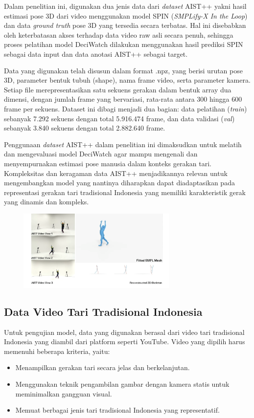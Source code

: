 Dalam penelitian ini, digunakan dua jenis data dari \textit{dataset} AIST++ yakni hasil estimasi pose 3D dari video menggunakan model SPIN (\textit{SMPLify-X In the Loop}) dan data \textit{ground truth} pose 3D yang tersedia secara terbatas. Hal ini disebabkan oleh keterbatasan akses terhadap data video raw asli secara penuh, sehingga proses pelatihan model DeciWatch dilakukan menggunakan hasil prediksi SPIN sebagai data input dan data anotasi AIST++ sebagai target.

Data yang digunakan telah disusun dalam format .npz, yang berisi urutan pose 3D, parameter bentuk tubuh (shape), nama frame video, serta parameter kamera. Setiap file merepresentasikan satu sekuens gerakan dalam bentuk array dua dimensi, dengan jumlah frame yang bervariasi, rata-rata antara 300 hingga 600 frame per sekuens. Dataset ini dibagi menjadi dua bagian: data pelatihan (\textit{train}) sebanyak 7.292 sekuens dengan total 5.916.474 frame, dan data validasi (\textit{val}) sebanyak 3.840 sekuens dengan total 2.882.640 frame.

Penggunaan \textit{dataset} AIST++ dalam penelitian ini dimaksudkan untuk melatih dan mengevaluasi model DeciWatch agar mampu mengenali dan menyempurnakan estimasi pose manusia dalam konteks gerakan tari. Kompleksitas dan keragaman data AIST++ menjadikannya relevan untuk mengembangkan model yang nantinya diharapkan dapat diadaptasikan pada representasi gerakan tari tradisional Indonesia yang memiliki karakteristik gerak yang dinamis dan kompleks.


\begin{figure}[H]
    \centering
    \includegraphics[width=0.7\textwidth]{images/aist.png}
    \label{fig:aist}
\end{figure}


\subsection{Data Video Tari Tradisional Indonesia}
Untuk pengujian model, data yang digunakan berasal dari video tari tradisional Indonesia yang diambil dari platform seperti YouTube. Video yang dipilih harus memenuhi beberapa kriteria, yaitu:
\begin{itemize}
    \item Menampilkan gerakan tari secara jelas dan berkelanjutan.
    \item Menggunakan teknik pengambilan gambar dengan kamera statis untuk meminimalkan gangguan visual.
    \item Memuat berbagai jenis tari tradisional Indonesia yang representatif.
\end{itemize}

